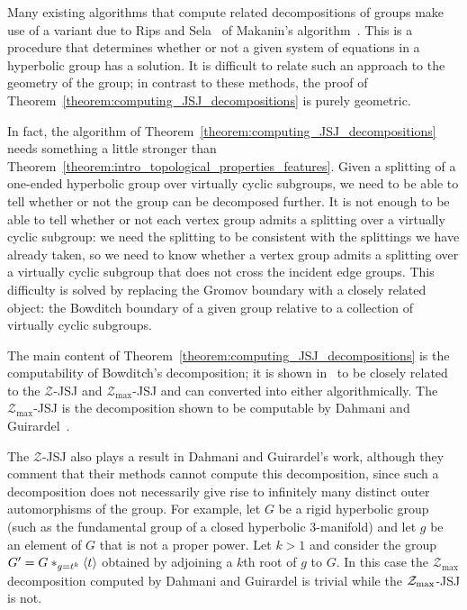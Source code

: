 Many existing algorithms that compute related decompositions of groups make use of a variant due to Rips and Sela~\cite{ripssela95} of Makanin's algorithm~\cite{makanin82}.
This is a procedure that determines whether or not a given system of equations in a hyperbolic group has a solution.
It is difficult to relate such an approach to the geometry of the group; in contrast to these methods, the proof of Theorem~\ref{theorem:computing_JSJ_decompositions} is purely geometric.

In fact, the algorithm of Theorem~\ref{theorem:computing_JSJ_decompositions} needs something a little stronger than Theorem~\ref{theorem:intro_topological_properties_features}. 
Given a splitting of a one-ended hyperbolic group over virtually cyclic subgroups, we need to be able to tell whether or not the group can be decomposed further.
It is not enough to be able to tell whether or not each vertex group admits a splitting over a virtually cyclic subgroup: we need the splitting to be consistent with the splittings we have already taken, so we need to know whether a vertex group admits a splitting over a virtually cyclic subgroup that does not cross the incident edge groups.
This difficulty is solved by replacing the Gromov boundary with a closely related object: the Bowditch boundary of a given group relative to a collection of virtually cyclic subgroups.

The main content of Theorem~\ref{theorem:computing_JSJ_decompositions} is the computability of Bowditch's decomposition; it is shown in~\cite{dahmaniguirardel11} to be closely related to the $\mathcal{Z}$-JSJ and $\mathcal{Z}_\text{max}$-JSJ and can converted into either algorithmically. 
The $\mathcal{Z}_\text{max}$-JSJ is the decomposition shown to be computable by Dahmani and Guirardel~\cite{dahmaniguirardel11}.

The $\mathcal{Z}$-JSJ also plays a result in Dahmani and Guirardel's work, although they comment that their methods cannot compute this decomposition, since such a decomposition does not necessarily give rise to infinitely many distinct outer automorphisms of the group. 
For example, let $G$ be a rigid hyperbolic group (such as the fundamental group of a closed hyperbolic 3-manifold) and let $g$ be an element of $G$ that is not a proper power. 
Let $k > 1$ and consider the group $G' = G \ast_{g=t^k} \langle t\rangle$ obtained by adjoining a $k$th root of $g$ to $G$. 
In this case the $\mathcal{Z}_\text{max}$ decomposition computed by Dahmani and Guirardel is trivial while the $\mathcal{Z}_\text{max}$-JSJ is not.

